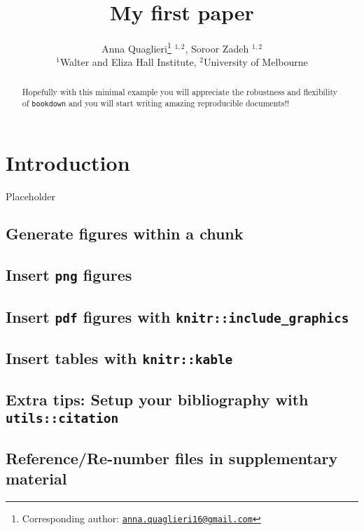 \documentclass[12pt,]{article}
\title{My first paper}
\author{Anna Quaglieri\footnote{Corresponding author:
  \href{mailto:anna.quaglieri16@gmail.com}{\nolinkurl{anna.quaglieri16@gmail.com}}}
\(^{1,2}\), Soroor Zadeh \(^{1,2}\)\\
\(^1\)Walter and Eliza Hall Institute, \(^2\)University of Melbourne}
\date{}
\begin{document}
\maketitle
\begin{abstract}
Hopefully with this minimal example you will appreciate the robustness
and flexibility of \texttt{bookdown} and you will start writing amazing
reproducible documents!!
\end{abstract}

{
\setcounter{tocdepth}{2}
\tableofcontents
}
\section{Introduction}\label{introduction}

Placeholder

\subsection{Generate figures within a
chunk}\label{generate-figures-within-a-chunk}

\subsection{\texorpdfstring{Insert \texttt{png}
figures}{Insert png figures}}\label{insert-png-figures}

\subsection{\texorpdfstring{Insert \texttt{pdf} figures with
\texttt{knitr::include\_graphics}}{Insert pdf figures with knitr::include\_graphics}}\label{insert-pdf-figures-with-knitrinclude_graphics}

\subsection{\texorpdfstring{Insert tables with
\texttt{knitr::kable}}{Insert tables with knitr::kable}}\label{insert-tables-with-knitrkable}

\subsection{\texorpdfstring{Extra tips: Setup your bibliography with
\texttt{utils::citation}}{Extra tips: Setup your bibliography with utils::citation}}\label{extra-tips-setup-your-bibliography-with-utilscitation}

\subsection{Reference/Re-number files in supplementary
material}\label{referencere-number-files-in-supplementary-material}
\end{document}
